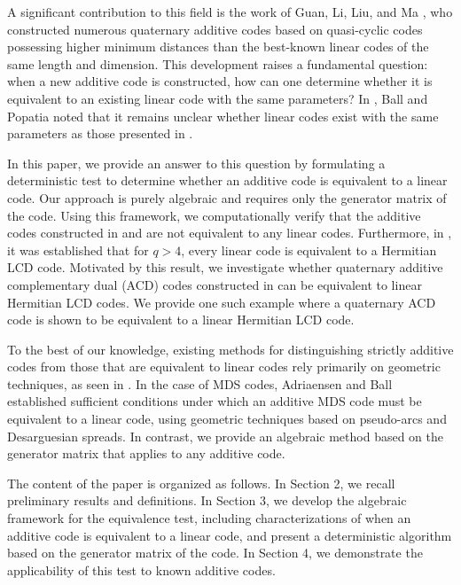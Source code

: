 \documentclass[a4paper,12pt]{article}
\theoremstyle{plain}
\theoremstyle{definition}
\begin{document}
A significant contribution to this field is the work of Guan, Li, Liu, and  Ma \cite{guan2023},  who constructed numerous quaternary additive codes based on quasi-cyclic codes possessing higher minimum distances than the best-known linear codes of the same length and dimension.
This development raises a fundamental question: when a new additive code is constructed, how can one  determine whether it is  equivalent to an existing linear code with the same parameters? In \cite{ball2026}, Ball and Popatia noted that it remains unclear whether linear codes exist with the same parameters as those presented in \cite{guan2023}.


In this paper,  we provide an answer to this question by formulating a deterministic   test to determine whether an additive code is equivalent to a linear code. 
Our approach is purely algebraic and requires only the generator matrix of the code.
Using this framework, we computationally verify that the additive codes constructed in \cite{guan2023} and \cite{zhu2024}
are not equivalent to any linear codes.  
Furthermore, in  \cite{carlet2018}, it was established that for $q > 4$, every linear code is equivalent to a Hermitian LCD code. 
Motivated by this result, we investigate whether quaternary additive complementary dual (ACD) codes constructed in \cite{guan2023} can be equivalent to linear Hermitian LCD codes. 
We provide one such example where a quaternary ACD code is shown to be equivalent to a linear Hermitian LCD code.

To the best of our knowledge, existing methods for distinguishing strictly additive codes from those that are equivalent to linear codes rely primarily on geometric techniques, as seen in \cite{ball2023, ball2023b,  ball2025, ball2026, blokhuis2004}. 
In the case of MDS codes, Adriaensen and Ball \cite{ball2023} established sufficient conditions under which an additive MDS code must be equivalent to a linear code, using geometric techniques based on pseudo-arcs and Desarguesian spreads.
In contrast, we provide an algebraic method based on the generator matrix that applies to any additive code.


The content of the paper is organized as follows. 
In Section 2, we recall preliminary results and definitions. 
In Section 3, we develop the algebraic framework for the equivalence test, including characterizations of when an additive code is equivalent to a linear code, and present a deterministic algorithm based on the generator matrix of the code.
In Section 4, we demonstrate the applicability of this test to known  additive codes.  
 
\end{document}

